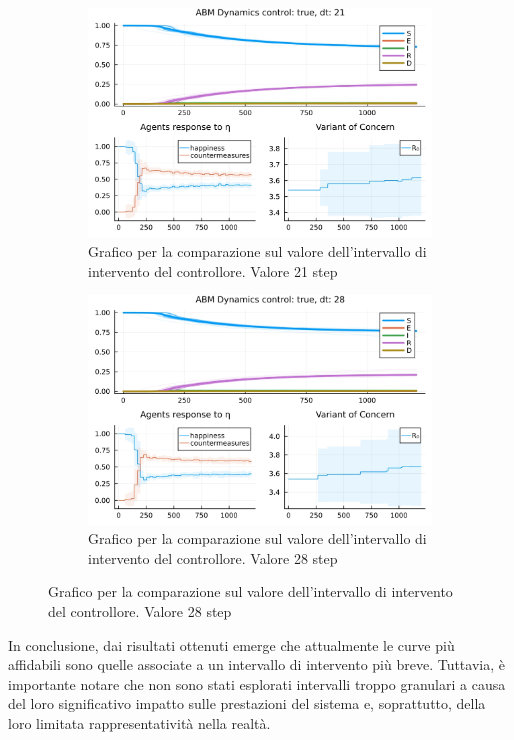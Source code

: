 \begin{figure}[H]
\begin{subfigure}[b]{0.45\textwidth}
		\includegraphics[width=\textwidth]{img/SocialNetworkABM_3_DT.jpg}
		\caption{Grafico per la comparazione sul valore dell'intervallo di intervento del controllore. Valore 21 step}
		\label{fig:comparison_dt_21}
	\end{subfigure}
	\hfill
	\begin{subfigure}[b]{0.45\textwidth}
		\centering
		\includegraphics[width=\textwidth]{img/SocialNetworkABM_4_DT.jpg}
		\caption{Grafico per la comparazione sul valore dell'intervallo di intervento del controllore. Valore 28 step}
		\label{fig:comparison_dt_28}
	\end{subfigure}
\end{figure}

In conclusione, dai risultati ottenuti emerge che attualmente le curve 
più affidabili sono quelle associate a un intervallo di intervento più 
breve. Tuttavia, è importante notare che non sono stati esplorati 
intervalli troppo granulari a causa del loro significativo impatto 
sulle prestazioni del sistema e, soprattutto, della loro limitata 
rappresentatività nella realtà.

